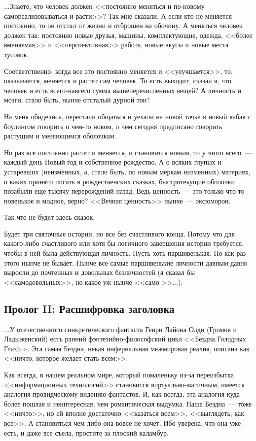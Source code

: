 \documentclass{scrbook}
\newcommand{\flqq}{<<}
\newcommand{\frqq}{>>}
\newcommand{\mdash}{~--- }
\newcommand{\essaysection}[1]{\subsection*{#1}\nopagebreak}
\begin{document}
...Знаете, что человек должен {\flqq}постоянно меняться и по-новому самореализовываться и расти{\frqq}? Так мне сказали. А если кто не меняется постоянно, то он отстал от жизни и отброшен на обочину. А меняться человек должен так: постоянно новые друзья, машины, комплектующие, одежда, {\flqq}более вменяемая{\frqq} и {\flqq}перспективная{\frqq} работа, новые вкусы и новые места тусовок.

Соответственно, когда все это постоянно меняется и {\flqq}улучшается{\frqq}, то, оказывается, меняется и растет сам человек. То есть выходит, сказал я, что человек и есть всего-навсего сумма вышеперечисленных вещей? А личность и мозги, стало быть, нынче отсталый дурной тон?

На меня обиделись, перестали общаться и уехали на новой тачке в новый кабак с боулингом говорить о чем-то новом, о чем сегодня предписано говорить растущим и меняющимся оболочкам.

Но раз все постоянно растет и меняется, и становится новым, то у этого всего{\mdash}каждый день Новый год и собственное рождество. А о всяких глупых и устаревших (неизменных, а, стало быть, по новым меркам низменных) материях, о каких принято писать в рождественских сказках, быстротекущие оболочки позабыли еще тысячу перерождений назад. Ведь ценность{\mdash}это только что-то новенькое и модное, верно? {\flqq}Вечная ценность{\frqq} нынче{\mdash}оксюморон.

Так что не будет здесь сказок.

Будет три святочные истории, но все без счастливого конца. Потому что для какого-либо счастливого или хотя бы логичного завершения истории требуется, чтобы в ней была действующая личность. Пусть хоть паршивенькая. Но как раз этого нынче не бывает. Нынче все самые паршивенькие личности давным-давно выросли до почтенных и довольных безличностей (я сказал бы {\flqq}самодовольных{\frqq}, но какое уж нынче {\flqq}само-{\frqq}...).

\essaysection{Пролог II: Расшифровка заголовка}

...У отечественного синкретического фантаста Генри Лайона Олди (Громов и Ладыженский) есть ранний фэнтезийно-философский цикл {\flqq}Бездна Голодных Глаз{\frqq}. Эта самая Бездна, некая инфернальная межмировая реалия, описана как {\flqq}ничто, которое желает стать всем{\frqq}.

Как всегда, в нашем реальном мире, который помаленьку из-за переизбытка {\flqq}информационных технологий{\frqq} становится виртуально-магичным, имеется аналогия провидческому видению фантастов. И, как всегда, эта аналогия куда более пошлая и неинтересная, чем романтическая выдумка. Наша Бездна{\mdash}тоже {\flqq}ничто{\frqq}, но ей вполне достаточно {\flqq}казаться всем{\frqq}, {\flqq}выглядеть, как все{\frqq}. А становиться чем-либо она вовсе не хочет. Ибо уверена, что она уже есть, и даже все съела, простите за плоский каламбур.
\end{document}
